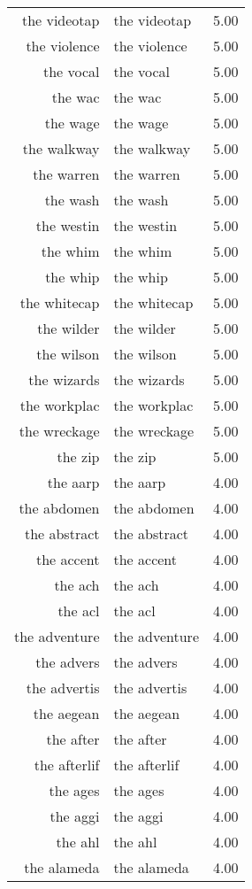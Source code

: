 \begin{table}[ht]
\begin{tabular}{rlr}
  the videotap & the videotap & 5.00 \\ 
  the violence & the violence & 5.00 \\ 
  the vocal & the vocal & 5.00 \\ 
  the wac & the wac & 5.00 \\ 
  the wage & the wage & 5.00 \\ 
  the walkway & the walkway & 5.00 \\ 
  the warren & the warren & 5.00 \\ 
  the wash & the wash & 5.00 \\ 
  the westin & the westin & 5.00 \\ 
  the whim & the whim & 5.00 \\ 
  the whip & the whip & 5.00 \\ 
  the whitecap & the whitecap & 5.00 \\ 
  the wilder & the wilder & 5.00 \\ 
  the wilson & the wilson & 5.00 \\ 
  the wizards & the wizards & 5.00 \\ 
  the workplac & the workplac & 5.00 \\ 
  the wreckage & the wreckage & 5.00 \\ 
  the zip & the zip & 5.00 \\ 
  the aarp & the aarp & 4.00 \\ 
  the abdomen & the abdomen & 4.00 \\ 
  the abstract & the abstract & 4.00 \\ 
  the accent & the accent & 4.00 \\ 
  the ach & the ach & 4.00 \\ 
  the acl & the acl & 4.00 \\ 
  the adventure & the adventure & 4.00 \\ 
  the advers & the advers & 4.00 \\ 
  the advertis & the advertis & 4.00 \\ 
  the aegean & the aegean & 4.00 \\ 
  the after & the after & 4.00 \\ 
  the afterlif & the afterlif & 4.00 \\ 
  the ages & the ages & 4.00 \\ 
  the aggi & the aggi & 4.00 \\ 
  the ahl & the ahl & 4.00 \\ 
  the alameda & the alameda & 4.00 \\ 

\end{tabular}
\end{table}
